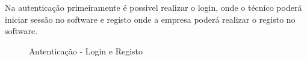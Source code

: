 Na autenticação primeiramente é possivel realizar o login, onde o técnico poderá iniciar sessão no software 
e registo onde a empresa poderá realizar o registo no software.

\begin{figure}[htb]%
    \centering
    \qquad
    \caption{Autenticação - Login e Registo}%
    \label{fig:17}%
\end{figure}

